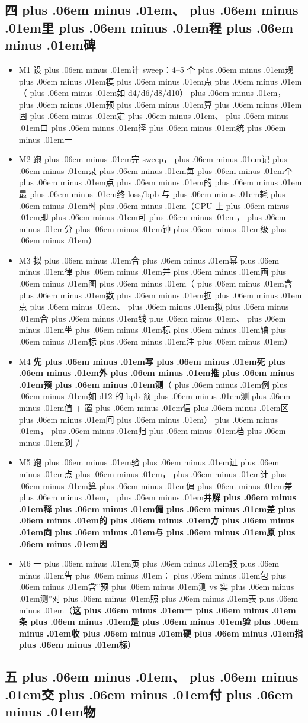 \documentclass[
]{article}
\newcommand{\passthrough}[1]{#1}
\providecommand{\tightlist}{%
  \setlength{\itemsep}{0pt}\setlength{\parskip}{0pt}}
\def\zh#1{{\zhfont #1}}
\def\codezh#1{{\zhmonofont #1}}
\def\zhglue{\hskip0pt plus .06em minus .01em}
\begin{document}
\subsection{\zh{四\zhglue 、\zhglue 里\zhglue 程\zhglue 碑}}\label{ux56dbux91ccux7a0bux7891-1}

\begin{itemize}
\tightlist
\item[$\square$]
  M1 \zh{设\zhglue 计} sweep\zh{：}4--5 \zh{个\zhglue 规\zhglue 模\zhglue 点\zhglue （\zhglue 如} d4/d6/d8/d10\zh{）\zhglue ，\zhglue 预\zhglue 算\zhglue 固\zhglue 定\zhglue 、\zhglue 口\zhglue 径\zhglue 统\zhglue 一}
\item[$\square$]
  M2 \zh{跑\zhglue 完} sweep\zh{，\zhglue 记\zhglue 录\zhglue 每\zhglue 个\zhglue 点\zhglue 的\zhglue 最\zhglue 终} loss/bpb \zh{与\zhglue 耗\zhglue 时\zhglue （}CPU \zh{上\zhglue 即\zhglue 可\zhglue ，\zhglue 分\zhglue 钟\zhglue 级\zhglue ）}
\item[$\square$]
  M3 \zh{拟\zhglue 合\zhglue 幂\zhglue 律\zhglue 并\zhglue 画\zhglue 图\zhglue （\zhglue 含\zhglue 数\zhglue 据\zhglue 点\zhglue 、\zhglue 拟\zhglue 合\zhglue 线\zhglue 、\zhglue 坐\zhglue 标\zhglue 轴\zhglue 标\zhglue 注\zhglue ）}
\item[$\square$]
  M4 \textbf{\zh{先\zhglue 写\zhglue 死\zhglue 外\zhglue 推\zhglue 预\zhglue 测}}\zh{（\zhglue 例\zhglue 如} d12 \zh{的} bpb \zh{预\zhglue 测\zhglue 值} + \zh{置\zhglue 信\zhglue 区\zhglue 间\zhglue ）\zhglue ，\zhglue 归\zhglue 档\zhglue 到} \passthrough{\codezh{{\zh{证}}{\zh{据}}/}}
\item[$\square$]
  M5 \zh{跑\zhglue 验\zhglue 证\zhglue 点\zhglue ，\zhglue 计\zhglue 算\zhglue 偏\zhglue 差\zhglue ，\zhglue 并}\textbf{\zh{解\zhglue 释\zhglue 偏\zhglue 差\zhglue 的\zhglue 方\zhglue 向\zhglue 与\zhglue 原\zhglue 因}}
\item[$\square$]
  M6 \zh{一\zhglue 页\zhglue 报\zhglue 告\zhglue ：\zhglue 包\zhglue 含}''\zh{预\zhglue 测} vs \zh{实\zhglue 测}''\zh{对\zhglue 照\zhglue 表\zhglue （}\textbf{\zh{这\zhglue 一\zhglue 条\zhglue 是\zhglue 验\zhglue 收\zhglue 硬\zhglue 指\zhglue 标}}\zh{）}
\end{itemize}

\subsection{\zh{五\zhglue 、\zhglue 交\zhglue 付\zhglue 物}}\label{ux4e94ux4ea4ux4ed8ux7269-1}
\end{document}
